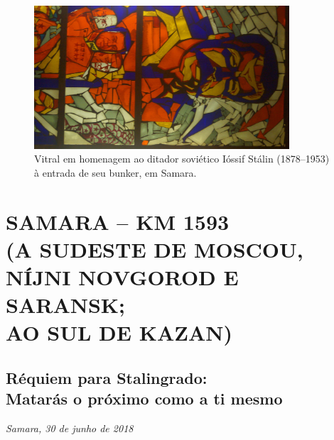 \movetoevenpage
\begin{absolutelynopagebreak}
\begin{vplace}
\begin{figure}[H]
\begin{adjustwidth}{-2.7cm}{}
  \vspace{-1.8cm}
  \hspace{2.6cm}
  \includegraphics[width=95mm]{./imgs/samara1.jpg}  
\end{adjustwidth}
  \caption{Vitral em homenagem ao ditador soviético Ióssif Stálin (1878--1953) à entrada de seu bunker, em Samara.}

\thispagestyle{empty}

\end{figure}
\end{vplace}

\end{absolutelynopagebreak}

\movetooddpage
{}
\part*{SAMARA -- KM 1593\\(A SUDESTE DE MOSCOU,\\NÍJNI NOVGOROD E SARANSK;\\AO SUL DE KAZAN)}


\chapter*{Réquiem para Stalingrado:\\Matarás o próximo como a ti mesmo}

\begin{flushright}
\emph{Samara, 30 de junho de 2018}
\end{flushright}

